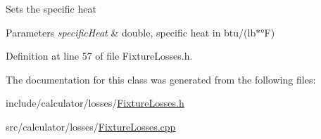 Sets the specific heat 
\begin{DoxyParams}{Parameters}
{\em specific\+Heat} & double, specific heat in btu/(lb$\ast$°F) \\
\hline
\end{DoxyParams}


Definition at line 57 of file Fixture\+Losses.\+h.



The documentation for this class was generated from the following files\+:\begin{DoxyCompactItemize}
\item 
include/calculator/losses/\hyperlink{_fixture_losses_8h}{Fixture\+Losses.\+h}\item 
src/calculator/losses/\hyperlink{_fixture_losses_8cpp}{Fixture\+Losses.\+cpp}\end{DoxyCompactItemize}

